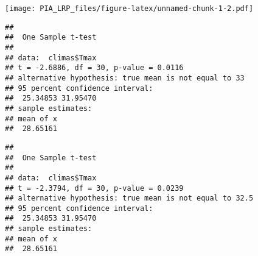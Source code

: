 \documentclass[
]{article}
\newenvironment{Shaded}{\begin{snugshade}}{\end{snugshade}}
\newcommand{\AttributeTok}[1]{\textcolor[rgb]{0.77,0.63,0.00}{#1}}
\newcommand{\CommentTok}[1]{\textcolor[rgb]{0.56,0.35,0.01}{\textit{#1}}}
\newcommand{\DecValTok}[1]{\textcolor[rgb]{0.00,0.00,0.81}{#1}}
\newcommand{\FloatTok}[1]{\textcolor[rgb]{0.00,0.00,0.81}{#1}}
\newcommand{\FunctionTok}[1]{\textcolor[rgb]{0.00,0.00,0.00}{#1}}
\newcommand{\NormalTok}[1]{#1}
\newcommand{\SpecialCharTok}[1]{\textcolor[rgb]{0.00,0.00,0.00}{#1}}
\begin{document}
\texttt{[image: PIA\_LRP\_files/figure-latex/unnamed-chunk-1-2.pdf]}

\begin{Shaded}
\end{Shaded}

\begin{verbatim}
## 
##  One Sample t-test
## 
## data:  climas$Tmax
## t = -2.6886, df = 30, p-value = 0.0116
## alternative hypothesis: true mean is not equal to 33
## 95 percent confidence interval:
##  25.34853 31.95470
## sample estimates:
## mean of x 
##  28.65161
\end{verbatim}

\begin{Shaded}
\end{Shaded}

\begin{verbatim}
## 
##  One Sample t-test
## 
## data:  climas$Tmax
## t = -2.3794, df = 30, p-value = 0.0239
## alternative hypothesis: true mean is not equal to 32.5
## 95 percent confidence interval:
##  25.34853 31.95470
## sample estimates:
## mean of x 
##  28.65161
\end{verbatim}

\begin{Shaded}
\end{Shaded}
\end{document}
